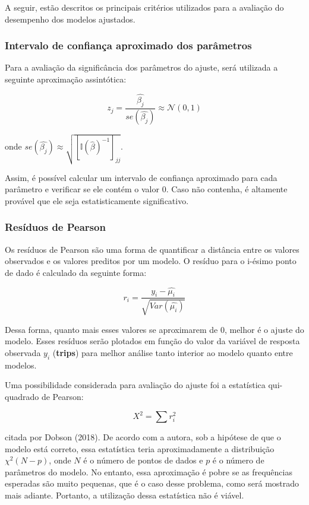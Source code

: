 \documentclass[
  twocolumn]{article}
\begin{document}
A seguir, estão descritos os principais critérios utilizados para a
avaliação do desempenho dos modelos ajustados.

\subsubsection{Intervalo de confiança aproximado dos
parâmetros}\label{intervalo-de-confianuxe7a-aproximado-dos-paruxe2metros}

Para a avaliação da significância dos parâmetros do ajuste, será
utilizada a seguinte aproximação assintótica:

\[
z_j = \dfrac{\hat{\beta_j}}{se(\hat{\beta_j})} \approx \mathcal{N}(0, 1)
\]

onde
\(se(\hat{\beta_j}) \approx \sqrt{[\mathbb{I}(\hat{\beta})^{-1}]_{jj}}\).

Assim, é possível calcular um intervalo de confiança aproximado para
cada parâmetro e verificar se ele contém o valor 0. Caso não contenha, é
altamente provável que ele seja estatisticamente significativo.

\subsubsection{Resíduos de Pearson}\label{resuxedduos-de-pearson}

Os resíduos de Pearson são uma forma de quantificar a distância entre os
valores observados e os valores preditos por um modelo. O resíduo para o
i-ésimo ponto de dado é calculado da seguinte forma:

\[
r_i = \dfrac{y_i - \hat{\mu_i}}{\sqrt{Var(\hat{\mu_i})}}
\]

Dessa forma, quanto mais esses valores se aproximarem de 0, melhor é o
ajuste do modelo. Esses resíduos serão plotados em função do valor da
variável de resposta observada \(y_i\) (\textbf{trips}) para melhor
análise tanto interior ao modelo quanto entre modelos.

Uma possibilidade considerada para avaliação do ajuste foi a estatística
qui-quadrado de Pearson:

\[
X^2 = \sum r_i^2
\]

citada por Dobson (2018). De acordo com a autora, sob a hipótese de que
o modelo está correto, essa estatística teria aproximadamente a
distribuição \(\chi^2(N-p)\), onde \(N\) é o número de pontos de dados e
\(p\) é o número de parâmetros do modelo. No entanto, essa aproximação é
pobre se as frequências esperadas são muito pequenas, que é o caso desse
problema, como será mostrado mais adiante. Portanto, a utilização dessa
estatística não é viável.
\end{document}
